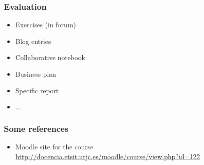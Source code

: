 
\begin{frame}
\frametitle{Evaluation}

\begin{itemize}
\item Exercises (in forum)
\item Blog entries
\item Collaborative notebook
\item Business plan
\item Specific report
\item ...
\end{itemize}

\end{frame}



\begin{frame}
\frametitle{Some references}

\begin{itemize}
\item Moodle site for the course \\
  \url{http://docencia.etsit.urjc.es/moodle/course/view.php?id=122}
\end{itemize}

\end{frame}
